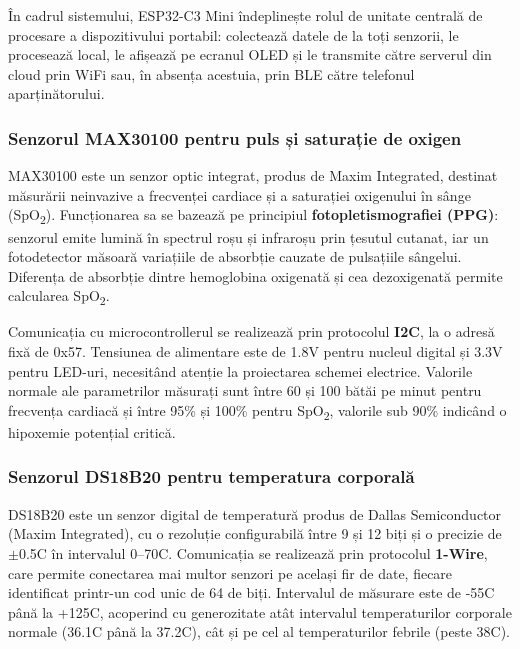 \documentclass[12pt,a4paper]{article}
\newcommand{\spo}{SpO\textsubscript{2}}
\begin{document}
În cadrul sistemului, ESP32-C3 Mini îndeplinește rolul de unitate centrală de procesare a dispozitivului portabil: colectează datele de la toți senzorii, le procesează local, le afișează pe ecranul OLED și le transmite către serverul din cloud prin WiFi sau, în absența acestuia, prin BLE către telefonul aparținătorului.

\subsubsection{Senzorul MAX30100 pentru puls și saturație de oxigen}

MAX30100 este un senzor optic integrat, produs de Maxim Integrated, destinat măsurării neinvazive a frecvenței cardiace și a saturației oxigenului în sânge (\spo). Funcționarea sa se bazează pe principiul \textbf{fotopletismografiei (PPG)}: senzorul emite lumină în spectrul roșu și infraroșu prin țesutul cutanat, iar un fotodetector măsoară variațiile de absorbție cauzate de pulsațiile sângelui. Diferența de absorbție dintre hemoglobina oxigenată și cea dezoxigenată permite calcularea \spo.

Comunicația cu microcontrollerul se realizează prin protocolul \textbf{I2C}, la o adresă fixă de 0x57. Tensiunea de alimentare este de 1.8V pentru nucleul digital și 3.3V pentru LED-uri, necesitând atenție la proiectarea schemei electrice. Valorile normale ale parametrilor măsurați sunt între 60 și 100 bătăi pe minut pentru frecvența cardiacă și între 95\% și 100\% pentru \spo, valorile sub 90\% indicând o hipoxemie potențial critică.

\subsubsection{Senzorul DS18B20 pentru temperatura corporală}

DS18B20 este un senzor digital de temperatură produs de Dallas Semiconductor (Maxim Integrated), cu o rezoluție configurabilă între 9 și 12 biți și o precizie de $\pm$0.5\textdegree C în intervalul 0--70\textdegree C. Comunicația se realizează prin protocolul \textbf{1-Wire}, care permite conectarea mai multor senzori pe același fir de date, fiecare identificat printr-un cod unic de 64 de biți. Intervalul de măsurare este de -55\textdegree C până la +125\textdegree C, acoperind cu generozitate atât intervalul temperaturilor corporale normale (36.1\textdegree C până la 37.2\textdegree C), cât și pe cel al temperaturilor febrile (peste 38\textdegree C).
\end{document}
